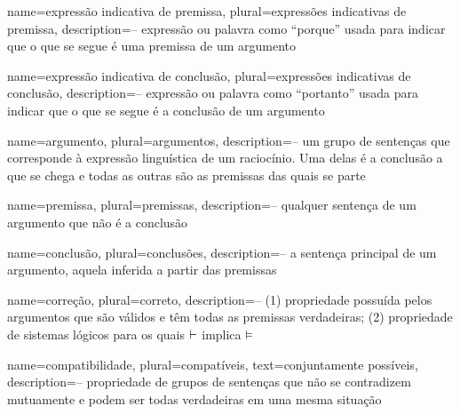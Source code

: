 

\makeglossaries



{
name=expressão indicativa de premissa,
plural=expressões indicativas de premissa,
description={-- expressão ou palavra como ``porque'' usada para indicar que o que se segue é uma premissa de um argumento}
}

{
name=expressão indicativa de conclusão,
plural=expressões indicativas de conclusão,
description={-- expressão ou palavra como ``portanto'' usada para indicar que o que se segue é a conclusão de um argumento}
}

{
name=argumento,
plural=argumentos,
description={-- um grupo de sentenças que corresponde à expressão linguística de um raciocínio. Uma delas é a conclusão a que se chega e todas as outras são as premissas das quais se parte}
}

{
name=premissa,
plural=premissas,
description={-- qualquer sentença de um argumento que não é a conclusão}
}

{
name=conclusão,
plural=conclusões,
description={-- a sentença principal de um argumento, aquela inferida a partir das premissas}
}



{
name=correção,
plural=correto,
description={-- (1) propriedade possuída pelos argumentos que são válidos e têm todas as premissas verdadeiras; (2) propriedade de sistemas lógicos para os quais $\vdash$ implica $\vDash$}
}

{
name=compatibilidade,
plural=compatíveis,
text={conjuntamente possíveis}, %
description={-- propriedade de grupos de sentenças que não se contradizem mutuamente e podem ser todas verdadeiras em uma mesma situação}
}

